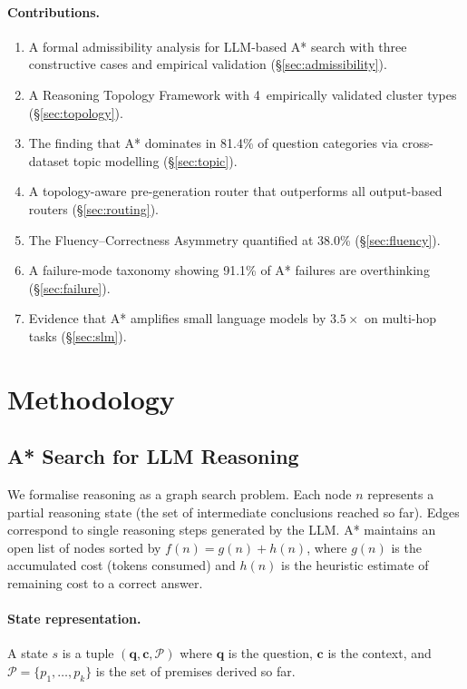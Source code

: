 \documentclass[11pt]{article}
\begin{document}
\paragraph{Contributions.}
\begin{enumerate}[leftmargin=1.5em,itemsep=2pt]
\item A formal admissibility analysis for LLM-based A* search with three constructive cases and empirical validation (\S\ref{sec:admissibility}).
\item A Reasoning Topology Framework with 4~empirically validated cluster types (\S\ref{sec:topology}).
\item The finding that A* dominates in 81.4\% of question categories via cross-dataset topic modelling (\S\ref{sec:topic}).
\item A topology-aware pre-generation router that outperforms all output-based routers (\S\ref{sec:routing}).
\item The Fluency--Correctness Asymmetry quantified at 38.0\% (\S\ref{sec:fluency}).
\item A failure-mode taxonomy showing 91.1\% of A* failures are overthinking (\S\ref{sec:failure}).
\item Evidence that A* amplifies small language models by $3.5\times$ on multi-hop tasks (\S\ref{sec:slm}).
\end{enumerate}

\section{Methodology}
\label{sec:method}

\subsection{A* Search for LLM Reasoning}
\label{sec:astar_method}

We formalise reasoning as a graph search problem. Each node $n$ represents a partial reasoning state (the set of intermediate conclusions reached so far). Edges correspond to single reasoning steps generated by the LLM. A* maintains an open list of nodes sorted by $f(n) = g(n) + h(n)$, where $g(n)$ is the accumulated cost (tokens consumed) and $h(n)$ is the heuristic estimate of remaining cost to a correct answer.

\paragraph{State representation.}
A state $s$ is a tuple $(\mathbf{q}, \mathbf{c}, \mathcal{P})$ where $\mathbf{q}$ is the question, $\mathbf{c}$ is the context, and $\mathcal{P} = \{p_1, \ldots, p_k\}$ is the set of premises derived so far.
\end{document}
